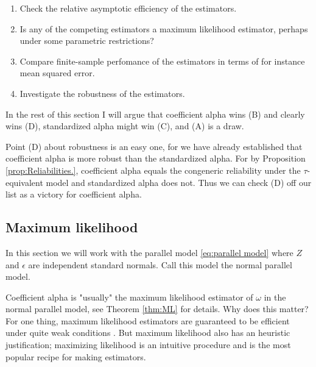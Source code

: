 \documentclass{article}
\theoremstyle{plain}
\theoremstyle{plain}
\theoremstyle{definition}
\theoremstyle{remark}
\theoremstyle{definition}
\theoremstyle{plain}
\theoremstyle{plain}
\theoremstyle{definition}
\begin{document}
\begin{enumerate}[label=(\Alph*)]
\item Check the relative asymptotic efficiency of the estimators.
\item Is any of the competing estimators a maximum likelihood estimator, perhaps under some parametric restrictions?
\item Compare finite-sample perfomance of the estimators in terms of for instance mean squared error.
\item Investigate the robustness of the estimators.
\end{enumerate}

In the rest of this section I will argue that coefficient alpha wins (B) and clearly wins (D), standardized alpha might win (C), and (A) is a draw.  

Point (D) about robustness is an easy one, for we have already established that coefficient alpha is more robust than the standardized alpha. For by Proposition \ref{prop:Reliabilities.}, coefficient alpha equals the congeneric reliability under the $\tau$-equivalent model and standardized alpha does not. Thus we can check (D) off our list as a victory for coefficient alpha.

\subsection{Maximum likelihood}
In this section we will work with the parallel model \eqref{eq:parallel model} where $Z$ and $\epsilon$ are independent standard normals. Call this model the normal parallel model.

Coefficient alpha is "usually" the maximum likelihood estimator of $\omega$ in the normal parallel model, see Theorem \ref{thm:ML} for details. Why does this matter? For one thing, maximum likelihood estimators are guaranteed to be efficient under quite weak conditions \citep[][Section 7.3]{Lehmann2004-ke}. But maximum likelihood also has an heuristic justification; maximizing likelihood is an intuitive procedure and is the most popular recipe for making estimators.
\end{document}
